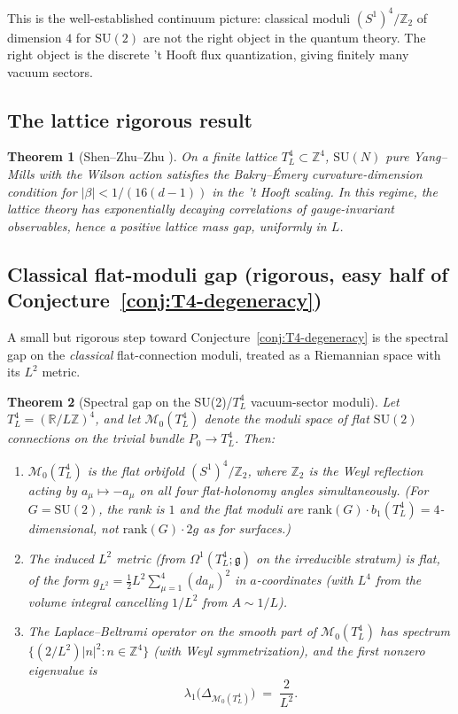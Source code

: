 \documentclass[11pt,letterpaper]{article}
\newtheorem{theorem}{Theorem}[section]
\theoremstyle{definition}
\newcommand{\bbR}{\mathbb{R}}
\newcommand{\bbZ}{\mathbb{Z}}
\newcommand{\cM}{\mathcal{M}}
\newcommand{\fg}{\mathfrak{g}}
\newcommand{\Lap}{\Delta}
\begin{document}
This is the well-established continuum picture: classical moduli $(S^1)^4/\bbZ_2$ of dimension $4$ for $\mathrm{SU}(2)$ are not the right object in the quantum theory. The right object is the discrete 't Hooft flux quantization, giving finitely many vacuum sectors.

\subsection{The lattice rigorous result}

\begin{theorem}[Shen--Zhu--Zhu \cite{SZZ2022}]\label{thm:SZZ}
On a finite lattice $T^4_L \subset \bbZ^4$, $\mathrm{SU}(N)$ pure Yang--Mills with the Wilson action satisfies the Bakry--\'Emery curvature-dimension condition for $|\beta| < 1/(16(d-1))$ in the 't Hooft scaling. In this regime, the lattice theory has exponentially decaying correlations of gauge-invariant observables, hence a positive lattice mass gap, uniformly in $L$.
\end{theorem}

\subsection{Classical flat-moduli gap (rigorous, easy half of Conjecture~\ref{conj:T4-degeneracy})}\label{sec:T4-flat-moduli-gap}

A small but rigorous step toward Conjecture~\ref{conj:T4-degeneracy} is the spectral gap on the \emph{classical} flat-connection moduli, treated as a Riemannian space with its $L^2$ metric.

\begin{theorem}[Spectral gap on the SU(2)/$T^4_L$ vacuum-sector moduli]\label{thm:T4-flat-moduli-gap}
Let $T^4_L = (\bbR/L\bbZ)^4$, and let $\cM_0(T^4_L)$ denote the moduli space of flat $\mathrm{SU}(2)$ connections on the trivial bundle $P_0 \to T^4_L$. Then:
\begin{enumerate}[label=(\roman*)]
\item $\cM_0(T^4_L)$ is the flat orbifold $(S^1)^4/\bbZ_2$, where $\bbZ_2$ is the Weyl reflection acting by $a_\mu \mapsto -a_\mu$ on all four flat-holonomy angles simultaneously. (For $G=\mathrm{SU}(2)$, the rank is $1$ and the flat moduli are $\mathrm{rank}(G)\cdot b_1(T^4_L) = 4$-dimensional, not $\mathrm{rank}(G)\cdot 2g$ as for surfaces.)
\item The induced $L^2$ metric (from $\Omega^1(T^4_L; \fg)$ on the irreducible stratum) is flat, of the form $g_{L^2} = \tfrac{1}{2} L^2 \sum_{\mu=1}^4 (da_\mu)^2$ in $a$-coordinates (with $L^4$ from the volume integral cancelling $1/L^2$ from $A \sim 1/L$).
\item The Laplace--Beltrami operator on the smooth part of $\cM_0(T^4_L)$ has spectrum $\{(2/L^2)|n|^2 : n \in \bbZ^4\}$ (with Weyl symmetrization), and the first nonzero eigenvalue is
\[
\lambda_1\bigl(\Lap_{\cM_0(T^4_L)}\bigr) \;=\; \frac{2}{L^2}.
\]
\end{enumerate}
\end{theorem}
\end{document}
